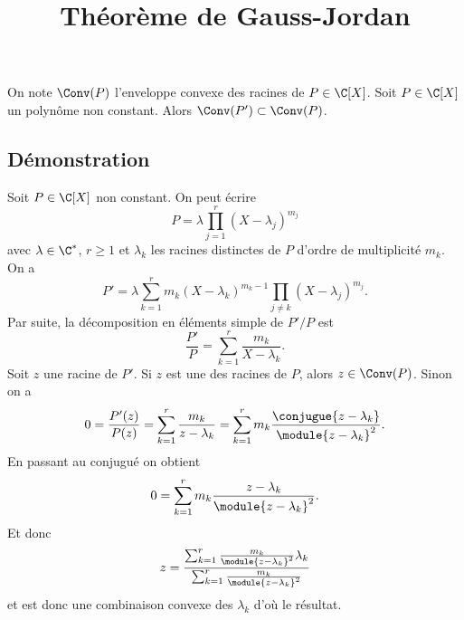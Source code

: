 \documentclass[fontsize=12pt,twoside=false,parskip=half, french]{scrartcl}
\title{Théorème de Gauss-Jordan}
\date{}
\author{}
\begin{document}
\maketitle
   \begin{Theoreme}
   On note $\Conv(P)$ l'enveloppe convexe des racines de $P \in \C[X]$.
   Soit $P \in \C[X]$ un polynôme non constant. Alors $\Conv(P') \subset \Conv(P)$.
   \end{Theoreme}
   \subsection{Démonstration}
      Soit $P \in \C[X]$ non constant. On peut écrire
      \[
         P = \lambda \prod_{j = 1}^r (X - \lambda_j)^{m_j}
      \]
      avec $\lambda \in \C^*$, $r \geq 1$ et $\lambda_k$ les racines distinctes
      de $P$ d'ordre de multiplicité $m_k$. On a
      \[
         P' = \lambda \sum_{k = 1}^r m_k (X - \lambda_k)^{m_k - 1} 
                                     \prod_{j \neq k} (X - \lambda_j)^{m_j}.
      \]
      Par suite, la décomposition en éléments simple de $P'/P$ est
      \[
        \frac{P'}{P} = \sum_{k = 1}^r \frac{m_k}{X - \lambda_k}.
      \]
      Soit $z$ une racine de $P'$. Si $z$ est une des racines de $P$, alors
      $z \in \Conv(P)$. Sinon on a
      \[
         0 = \frac{P'(z)}{P(z)} 
           = \sum_{k = 1}^r \frac{m_k}{z - \lambda_k}
           = \sum_{k = 1}^r m_k\frac{\conjugue{z - \lambda_k}}{\module{z - \lambda_k}^2}.
      \]
      En passant au conjugué on obtient
      \[
        0 = \sum_{k = 1}^r m_k\frac{z - \lambda_k}{\module{z - \lambda_k}^2}.
      \]
      Et donc
      \[  
        z = \frac{\sum_{k = 1}^r \frac{m_k}{\module{z - \lambda_k}^2}\lambda_k}
                 {\sum_{k = 1}^r \frac{m_k}{\module{z - \lambda_k}^2}}
      \]
      et est donc une combinaison convexe des $\lambda_k$ d'où le résultat.
\end{document}
